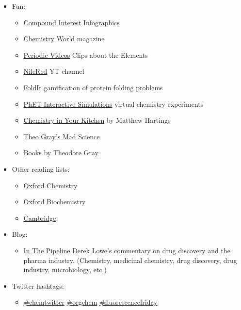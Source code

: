 \documentclass{article}
\begin{document}
\begin{itemize}
    \item Fun:
    \begin{itemize}
        \item \href{https://www.compoundchem.com/}{Compound Interest} Infographics
        \item \href{https://www.chemistryworld.com/}{Chemistry World} magazine
        \item \href{http://www.periodicvideos.com/}{Periodic Videos} Clips about the Elements
        \item \href{https://www.youtube.com/user/TheRedNile}{NileRed} YT channel
        \item \href{https://fold.it/}{FoldIt} gamification of protein folding problems
        \item \href{https://phet.colorado.edu/en/simulations/category/chemistry}{PhET Interactive Simulations} virtual chemistry experiments
        \item \href{https://www.goodreads.com/book/show/31338984-chemistry-in-your-kitchen}{Chemistry in Your Kitchen} by Matthew Hartings
        \item \href{https://www.goodreads.com/book/show/6398447-theo-gray-s-mad-science}{Theo Gray's Mad Science}
        \item \href{https://www.goodreads.com/author/list/2898508.Theodore_Gray}{Books by Theodore Gray}
    \end{itemize}
    
    \item Other reading lists:
    \begin{itemize}
        \item \href{http://www.ox.ac.uk/sites/files/oxford/media_wysiwyg/Introductory_reading_for_Chemistry.pdf}{Oxford} Chemistry
        \item \href{https://www.bioch.ox.ac.uk/recommended-reading-list}{Oxford} Biochemistry
        \item \href{https://www.natsci.tripos.cam.ac.uk/prospective-students/reading}{Cambridge}
    \end{itemize}
    \item Blog:
    \begin{itemize}
        \item \href{https://www.science.org/blogs/pipeline}{In The Pipeline} Derek Lowe's commentary on drug discovery and the pharma industry. (Chemistry, medicinal chemistry, drug discovery, drug industry, microbiology, etc.)
    \end{itemize}
    \item Twitter hashtags:
    \begin{itemize}
        \item \href{https://twitter.com/hashtag/chemtwitter}{\#chemtwitter} \href{https://twitter.com/hashtag/orgchem}{\#orgchem} \href{https://twitter.com/hashtag/fluorescencefriday}{\#fluorescencefriday}
    \end{itemize}
    

\end{itemize}
\end{document}
